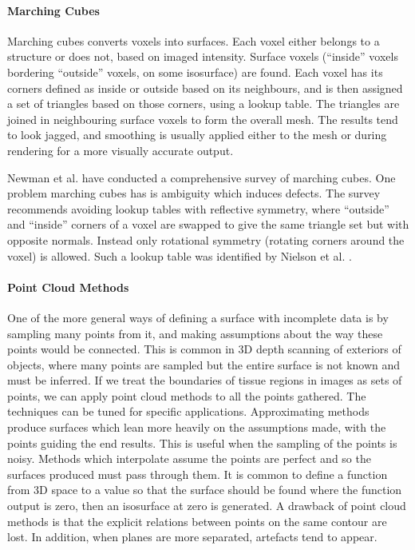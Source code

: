 \documentclass[11p, titlepage]{article}
\begin{document}
\paragraph{Marching Cubes}

Marching cubes \cite{lorensen1987marching} converts voxels into surfaces. Each voxel either belongs to a structure or does not, based on imaged intensity. Surface voxels (``inside'' voxels bordering ``outside'' voxels, on some isosurface) are found. Each voxel has its corners defined as inside or outside based on its neighbours, and is then assigned a set of triangles based on those corners, using a lookup table. The triangles are joined in neighbouring surface voxels to form the overall mesh. The results tend to look jagged, and smoothing is usually applied either to the mesh or during rendering for a more visually accurate output.

Newman et al. \cite{newman2006survey} have conducted a comprehensive survey of marching cubes. One problem marching cubes has is ambiguity which induces defects. The survey recommends avoiding lookup tables with reflective symmetry, where ``outside'' and ``inside'' corners of a voxel are swapped to give the same triangle set but with opposite normals. Instead only rotational symmetry (rotating corners around the voxel) is allowed. Such a lookup table was identified by Nielson et al. \cite{nielson2003marching}.

\paragraph{Point Cloud Methods}

One of the more general ways of defining a surface with incomplete data is by sampling many points from it, and making assumptions about the way these points would be connected. This is common in 3D depth scanning of exteriors of objects, where many points are sampled but the entire surface is not known and must be inferred. If we treat the boundaries of tissue regions in images as sets of points, we can apply point cloud methods to all the points gathered. The techniques can be tuned for specific applications. Approximating methods produce surfaces which lean more heavily on the assumptions made, with the points guiding the end results. This is useful when the sampling of the points is noisy. Methods which interpolate assume the points are perfect and so the surfaces produced must pass through them. It is common to define a function from 3D space to a value so that the surface should be found where the function output is zero, then an isosurface at zero is generated. A drawback of point cloud methods is that the explicit relations between points on the same contour are lost. In addition, when planes are more separated, artefacts tend to appear.
\end{document}
